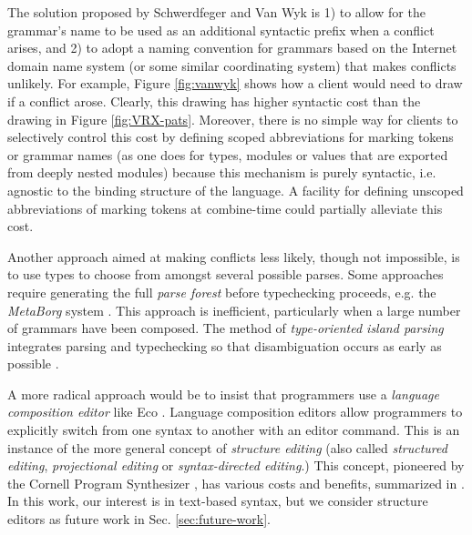 {The solution proposed by Schwerdfeger and Van Wyk \cite{conf/pldi/SchwerdfegerW09,schwerdfeger2010context} is 1) to allow for the grammar's name to be used as an additional syntactic prefix when a conflict arises, and 2) to adopt a naming convention for grammars  based on the Internet domain name system (or some similar coordinating system) that makes conflicts unlikely. For example, Figure \ref{fig:vanwyk} shows how a client would need to draw  if a conflict arose. Clearly, this drawing has higher syntactic cost than the drawing in Figure \ref{fig:VRX-pats}. Moreover, there is no simple way for clients to selectively control this cost by defining scoped abbreviations for marking tokens or grammar names (as one does for types, modules or values that are exported from deeply nested modules) because this mechanism is purely syntactic, i.e. agnostic to the binding structure of the language. A facility for defining unscoped abbreviations of marking tokens at combine-time could partially alleviate this cost.

Another approach aimed at making conflicts less likely, though not impossible, is to use types to choose from amongst several possible parses. Some approaches require generating the full \emph{parse forest} before typechecking proceeds, e.g. the \emph{MetaBorg} system \cite{bravenboer2005generalized}. This approach is inefficient, particularly when a large number of grammars have been composed. The method of \emph{type-oriented island parsing} integrates parsing and typechecking so that disambiguation occurs as early as possible \cite{DBLP:conf/sfp/SilkensenS12}.

A more radical approach would be to insist that programmers use a \emph{language composition editor} like Eco \cite{diekmann2014eco}. Language composition editors allow programmers to explicitly switch from one syntax to another with an editor command. This is an instance of the more general concept of \emph{structure editing} (also called \emph{structured editing}, \emph{projectional editing} or \emph{syntax-directed editing}.) This concept, pioneered by the Cornell Program Synthesizer \cite{teitelbaum_cornell_1981}, has various costs and benefits, summarized in \cite{DBLP:conf/sle/VolterSBK14}. In this work, our interest is in text-based syntax, but we consider structure editors as future work in Sec. \ref{sec:future-work}.

}
